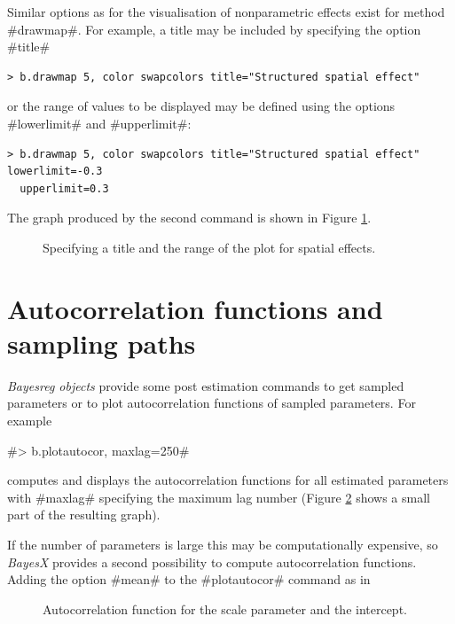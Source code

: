 \documentclass{article}
\begin{document}
Similar options as for the visualisation of nonparametric effects
exist for method #drawmap#. For example, a title may be included
by specifying the option #title#

\begin{verbatim}
> b.drawmap 5, color swapcolors title="Structured spatial effect"
\end{verbatim}

or the range of values to be displayed may be defined using the
options #lowerlimit# and #upperlimit#:

\begin{verbatim}
> b.drawmap 5, color swapcolors title="Structured spatial effect" lowerlimit=-0.3
  upperlimit=0.3
\end{verbatim}

The graph produced by the second command is shown in Figure
\ref{spat4}.

\begin{figure}[ht]
\begin{center}
{\it\caption{Specifying a title and the range of the plot for
spatial effects.\label{spat4}}}
\end{center}
\end{figure}

\section{Autocorrelation functions and sampling paths}\label{postest}

{\em Bayesreg objects} provide some post estimation commands to
get sampled parameters or to plot autocorrelation functions of
sampled parameters. For example

#> b.plotautocor, maxlag=250#

computes and displays the autocorrelation functions for all
estimated parameters with #maxlag# specifying the maximum lag
number (Figure \ref{autocor1} shows a small part of the resulting
graph).

If the number of parameters is large this may be computationally
expensive, so {\it BayesX} provides a second possibility to
compute autocorrelation functions. Adding the option #mean# to the
#plotautocor# command as in

\begin{figure}[ht]
\begin{center}
{\it\caption{Autocorrelation function for the scale parameter and
the intercept.\label{autocor1}}}
\end{center}
\end{figure}
\end{document}

